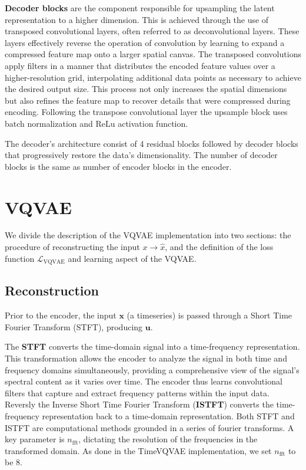 \textbf{Decoder blocks} are the component responsible for upsampling the latent representation to a higher dimension. This is achieved through the use of transposed convolutional layers, often referred to as deconvolutional layers. These layers effectively reverse the operation of convolution by learning to expand a compressed feature map onto a larger spatial canvas.
The transposed convolutions apply filters in a manner that distributes the encoded feature values over a higher-resolution grid, interpolating additional data points as necessary to achieve the desired output size.
This process not only increases the spatial dimensions but also refines the feature map to recover details that were compressed during encoding.
Following the transpose convolutional layer the upsample block uses batch normalization and ReLu activation function.

The decoder's architecture consist of 4 residual blocks followed by decoder blocks that progressively restore the data's dimensionality. The number of decoder blocks is the same as number of encoder blocks in the encoder. 


\section{VQVAE}

We divide the description of the VQVAE implementation into two sections: the procedure of reconstructing the input $x \rightarrow \hat{x}$, and the definition of the loss function $\mathcal{L}_\text{VQVAE}$ and learning aspect of the VQVAE. 

\subsection{Reconstruction}

Prior to the encoder, the input $\mathbf{x}$ (a timeseries) is passed through a Short Time Fourier Transform (STFT), producing $\mathbf{u}$. 

The \textbf{STFT} converts the time-domain signal into a time-frequency representation. This transformation allows the encoder to analyze the signal in both time and frequency domains simultaneously, providing a comprehensive view of the signal's spectral content as it varies over time. 
The encoder thus learns convolutional filters that capture and extract frequency patterns within the input data.
Reversly the Inverse Short Time Fourier Transform (\textbf{ISTFT}) converts the time-frequency representation back to a time-domain representation. 
Both STFT and ISTFT are computational methods grounded in a series of fourier transforms. A key parameter is $n_{\text{fft}}$, dictating the resolution of the frequencies in the transformed domain.
As done in the TimeVQVAE implementation, we set $n_{\text{fft}}$ to be 8.

